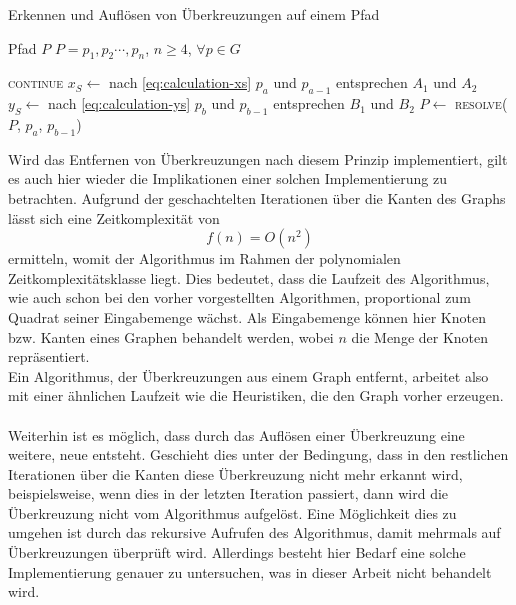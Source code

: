\begin{algorithm}
    \caption{Erkennen und Auflösen von Überkreuzungen auf einem Pfad}
    \label{alg:handle-crossover}
    \begin{algorithmic}[1]
        \Require Pfad $P$
        \Require $P=p_1,p_2\cdots,p_n$, $n \geq 4$, $\forall p \in G$
        
                    \State \textsc{continue}
                \EndIf
                \State $x_S \gets $ nach \vref{eq:calculation-xs}
                \Comment $p_a$ und $p_{a-1}$ entsprechen $A_1$ und $A_2$ 
                \State $y_S \gets $ nach \vref{eq:calculation-ys}
                \Comment $p_b$ und $p_{b-1}$ entsprechen $B_1$ und $B_2$ 
                    \State $P \gets $ \textsc{resolve}($P$, $p_a$, $p_{b-1}$)
                \EndIf
            \EndFor
        \EndFor
    \end{algorithmic}
\end{algorithm}

Wird das Entfernen von Überkreuzungen nach diesem Prinzip implementiert, gilt es auch hier wieder die Implikationen einer solchen Implementierung zu betrachten.
Aufgrund der geschachtelten Iterationen über die Kanten des Graphs lässt sich eine Zeitkomplexität von $$f(n) = O(n^2)$$ ermitteln, womit der Algorithmus im Rahmen der polynomialen Zeitkomplexitätsklasse liegt. 
Dies bedeutet, dass die Laufzeit des Algorithmus, wie auch schon bei den vorher vorgestellten Algorithmen, proportional zum Quadrat seiner Eingabemenge wächst.
Als Eingabemenge können hier Knoten bzw. Kanten eines Graphen behandelt werden, wobei $n$ die Menge der Knoten repräsentiert.
\\
Ein Algorithmus, der Überkreuzungen aus einem Graph entfernt, arbeitet also mit einer ähnlichen Laufzeit wie die Heuristiken, die den Graph vorher erzeugen.
\\\\
Weiterhin ist es möglich, dass durch das Auflösen einer Überkreuzung eine weitere, neue entsteht.
Geschieht dies unter der Bedingung, dass in den restlichen Iterationen über die Kanten diese Überkreuzung nicht mehr erkannt wird, beispielsweise, wenn dies in der letzten Iteration passiert, dann wird die Überkreuzung nicht vom Algorithmus aufgelöst.
Eine Möglichkeit dies zu umgehen ist durch das rekursive Aufrufen des Algorithmus, damit mehrmals auf Überkreuzungen überprüft wird.
Allerdings besteht hier Bedarf eine solche Implementierung genauer zu untersuchen, was in dieser Arbeit nicht behandelt wird.
